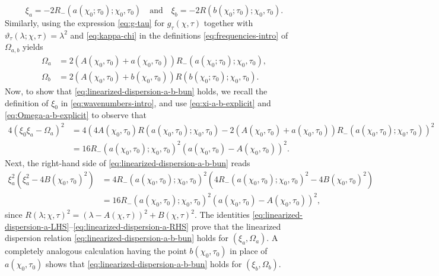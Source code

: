 \begin{equation}
\xi_a = -2 R_-(a(\chi_0;\tau_0);\chi_0,\tau_0)\quad \text{and}\quad
\xi_b = -2 R(b(\chi_0;\tau_0);\chi_0,\tau_0).
\label{eq:xi-a-b-explicit}
\end{equation}
Similarly, using the expression \eqref{eq:g-tau} for $g_\tau(\chi,\tau)$ together with $\vartheta_\tau(\lambda;\chi,\tau)=\lambda^2$ and \eqref{eq:kappa-chi} in the definitions \eqref{eq:frequencies-intro} of $\Omega_{a,b}$ yields
\begin{equation}
\begin{split}
\Omega_a &= 2(A(\chi_0,\tau_0) + a(\chi_0,\tau_0)) R_-(a(\chi_0;\tau_0);\chi_0,\tau_0),\\
\Omega_b &= 2(A(\chi_0,\tau_0) + b(\chi_0,\tau_0))  R(b(\chi_0;\tau_0);\chi_0,\tau_0).
\label{eq:Omega-a-b-explicit}
\end{split}
\end{equation}
Now, to show that \eqref{eq:linearized-dispersion-a-b-bun} holds, we recall the definition of $\xi_0$ in \eqref{eq:wavenumbers-intro}, and use \eqref{eq:xi-a-b-explicit} and \eqref{eq:Omega-a-b-explicit} to observe that
\begin{equation}
\begin{split}
4 (\xi_0 \xi_a-\Omega_a )^2 
&= 4\left(4 A(\chi_0,\tau_0) R(a(\chi_0,\tau_0); \chi_0, \tau_0) - 2(A(\chi_0, \tau_0)+a(\chi_0, \tau_0)) R_-(a(\chi_0, \tau_0); \chi_0, \tau_0)\right)^{2}\\
&=16 R_-(a(\chi_0, \tau_0); \chi_0, \tau_0)^2 \left(a(\chi_0, \tau_0) - A(\chi_0, \tau_0) \right)^2.%
\end{split}
\label{eq:linearized-dispersion-a-LHS}
\end{equation}
Next, the right-hand side of \eqref{eq:linearized-dispersion-a-b-bun} reads
\begin{equation}
\begin{split}
\xi_a^2 \left(\xi_a^2 - 4 B(\chi_0,\tau_0)^2 \right)
&= 4 R_-(a(\chi_0,\tau_0);\chi_0,\tau_0)^2 \left(4 R_-(a(\chi_0,\tau_0);\chi_0,\tau_0)^2 - 4 B(\chi_0,\tau_0)^2 \right)\\
&= 16 R_-(a(\chi_0,\tau_0);\chi_0,\tau_0)^2 \left( a(\chi_0,\tau_0) - A(\chi_0,\tau_0) \right)^2,
\end{split}
\label{eq:linearized-dispersion-a-RHS}
\end{equation}
since $R(\lambda;\chi,\tau)^2 = (\lambda- A(\chi,\tau))^2 + B(\chi,\tau)^2$. The identities \eqref{eq:linearized-dispersion-a-LHS}--\eqref{eq:linearized-dispersion-a-RHS} prove that the linearized dispersion relation \eqref{eq:linearized-dispersion-a-b-bun} holds for $(\xi_a, \Omega_a)$. A completely analogous calculation having the point $b(\chi_0,\tau_0)$ in place of $a(\chi_0,\tau_0)$ shows that \eqref{eq:linearized-dispersion-a-b-bun} holds for $(\xi_b, \Omega_b)$.

